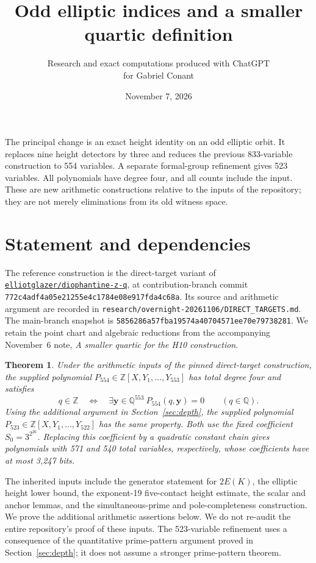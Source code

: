 \documentclass[11pt]{article}
\title{Odd elliptic indices and a smaller quartic definition}
\author{Research and exact computations produced with ChatGPT\\for Gabriel Conant}
\date{November 7, 2026}
\newtheorem{theorem}{Theorem}[section]
\newcommand{\Q}{\mathbb Q}
\newcommand{\Z}{\mathbb Z}
\begin{document}
\maketitle

\noindent The principal change is an exact height identity on an odd elliptic orbit. It replaces nine height detectors by three and reduces the previous 833-variable construction to 554 variables. A separate formal-group refinement gives 523 variables. All polynomials have degree four, and all counts include the input. These are new arithmetic constructions relative to the inputs of the repository; they are not merely eliminations from its old witness space.

\section{Statement and dependencies}
The reference construction is the direct-target variant of
\href{https://github.com/elliotglazer/diophantine-z-q}{\texttt{elliotglazer/diophantine-z-q}},
at contribution-branch commit
\texttt{772c4adf4a05e21255e4c1784e08e917fda4c68a}.
Its source and arithmetic argument are recorded in
\nolinkurl{research/overnight-20261106/DIRECT_TARGETS.md}.
The main-branch snapshot is
\texttt{5856286a57fba19574a40704571ee70e79738281}.
We retain the point chart and algebraic reductions from the accompanying November~6 note, \emph{A smaller quartic for the H10 construction}.

\begin{theorem}\label{thm:main}
Under the arithmetic inputs of the pinned direct-target construction, the supplied polynomial $P_{554}\in\Z[X,Y_1,\ldots,Y_{553}]$ has total degree four and satisfies
\[
 q\in\Z\quad\Longleftrightarrow\quad
 \exists\mathbf y\in\Q^{553}\ P_{554}(q,\mathbf y)=0
 \qquad(q\in\Q).
\]
Using the additional argument in Section~\ref{sec:depth}, the supplied polynomial $P_{523}\in\Z[X,Y_1,\ldots,Y_{522}]$ has the same property. Both use the fixed coefficient $S_0=3^{2^{26}}$. Replacing this coefficient by a quadratic constant chain gives polynomials with 571 and 540 total variables, respectively, whose coefficients have at most 3,247 bits.
\end{theorem}

The inherited inputs include the generator statement for $2E(K)$, the elliptic height lower bound, the exponent-19 five-contact height estimate, the scalar and anchor lemmas, and the simultaneous-prime and pole-completeness construction. We prove the additional arithmetic assertions below. We do not re-audit the entire repository's proof of these inputs. The 523-variable refinement uses a consequence of the quantitative prime-pattern argument proved in Section~\ref{sec:depth}; it does not assume a stronger prime-pattern theorem.
\end{document}
